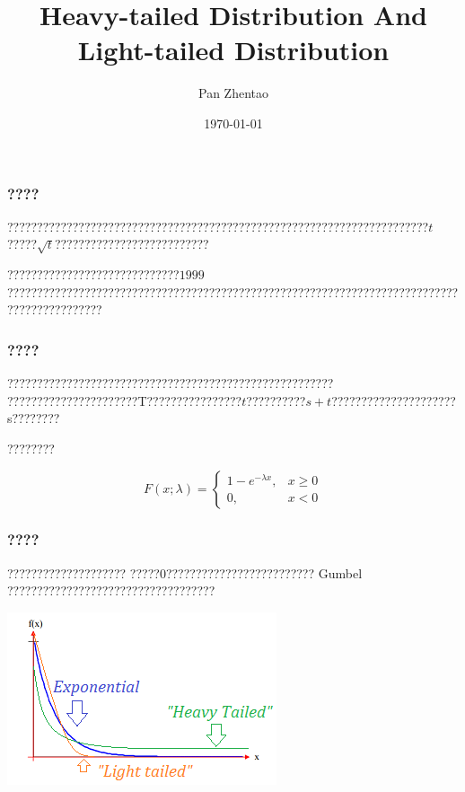 \documentclass[cjk]{beamer}
\title{Heavy-tailed Distribution And Light-tailed Distribution}
\author{Pan Zhentao}
\date{\today}
\begin{document}
	
	\begin{CJK*}{GBK}{song}     %
		
		\begin{frame} %
		
		\titlepage
		
		
	\end{frame}
	
	
	
	\begin{frame}
	
	\frametitle{????}
	\qquad ???????????????????????????????????????????????????????????????????????$t$?????$\sqrt{t}$??????????????????????????
	
	\qquad ?????????????????????????????$1999$????????????????????????????????????????????????????????????????????????????????????????????
	\tableofcontents
	
\end{frame}


\begin{frame}
\frametitle{????}
???????????????????????????????????????????????????????
??????????????????????T????????????????$t$??????????$s+t$?????????????????????s????????

????????

\begin{displaymath}
F\left ( x;\lambda  \right )= \left\{\begin{matrix}
1-e^{-\lambda x}, &x\geq 0  \\
0, &x< 0
\end{matrix}\right.
\end{displaymath}

\end{frame}

\begin{frame}
\frametitle{????}
\qquad ???????????????????? ?????$0$????????????????????????? Gumbel ???????????????????????????????????



\centering\includegraphics[scale=0.5]{image/light-tailed.png}



\end{frame}
\end{CJK*}
\end{document}
